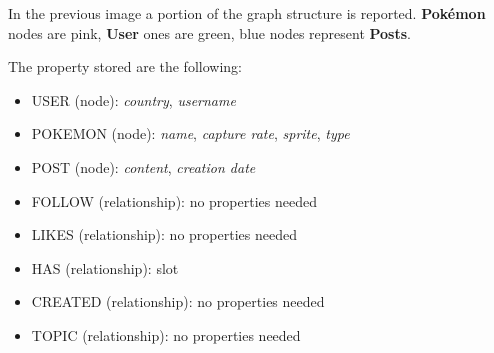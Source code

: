 In the previous image a portion of the graph structure is reported. 
\textbf{Pokémon} nodes are pink, \textbf{User} ones are green, blue nodes represent \textbf{Posts}.

The property stored are the following:
\begin{itemize}
	\item USER (node): \textit{country}, \textit{username}
	\item POKEMON (node): \textit{name}, \textit{capture rate},  \textit{sprite}, \textit{type}
	\item POST (node): \textit{content}, \textit{creation date}
	\item FOLLOW (relationship): no properties needed
	\item LIKES (relationship): no properties needed
	\item HAS (relationship): slot
	\item CREATED (relationship): no properties needed
	\item TOPIC (relationship): no properties needed
\end{itemize}


